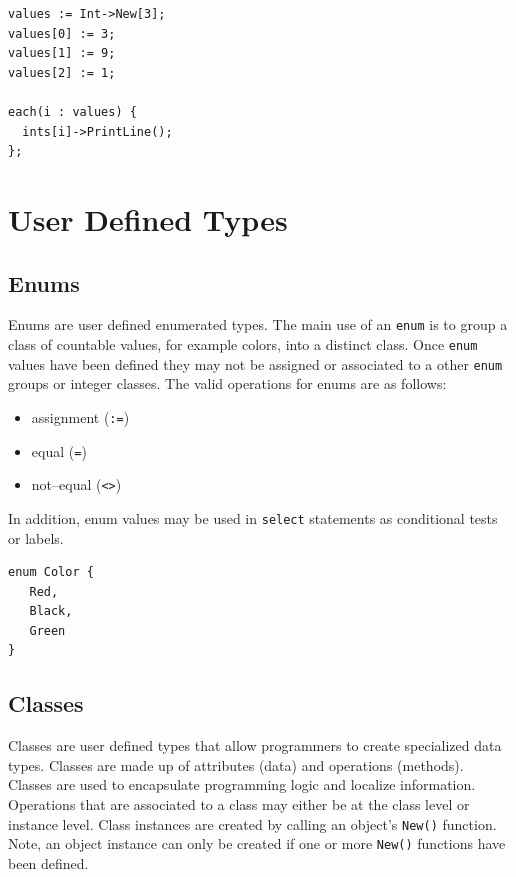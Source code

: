 \documentclass[12pt]{article}
\begin{document}
\begin{verbatim}
values := Int->New[3];
values[0] := 3;
values[1] := 9;
values[2] := 1;

each(i : values) {
  ints[i]->PrintLine();
};
\end{verbatim}

\section{User Defined Types}

\subsection{Enums}
Enums are user defined enumerated types.  The main use of an  \texttt{enum}  is to group a class of countable values, for example colors, into a distinct class.  Once \texttt{enum}  values have been defined they may not be assigned or associated to a other \texttt{enum}  groups or integer classes.  The valid operations for enums are as follows:

\begin{itemize}
    \item assignment (\texttt{:=})
    \item equal (\texttt{=})
    \item not--equal (\texttt{<>})
\end{itemize}

In addition, enum values may be used in \texttt{select} statements as conditional tests or labels.

\begin{verbatim}
enum Color {
   Red,
   Black,
   Green
}
\end{verbatim}

\subsection{Classes}
Classes are user defined types that allow programmers to create specialized data types.  Classes are made up of attributes (data) and operations (methods).  Classes are used to encapsulate programming logic and localize information.  Operations that are associated to a class may either be at the class level or instance level.  Class instances are created by calling an object's \texttt{New()} function.  Note, an object instance can only be created if one or more \texttt{New()} functions have been defined.
\end{document}
